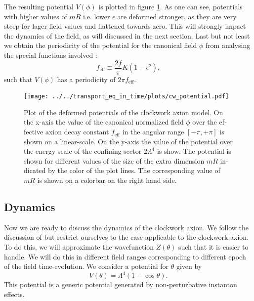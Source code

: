 \documentclass[master,       %
               twoside,        %
               BCOR10mm,       %
               english,ngerman, %
               ]{GAUBM}
\begin{document}
\begin{otherlanguage}{english}
The resulting potential $V(\phi)$ is plotted in figure \ref{fig:clockwork_pot_plot}. As one can see, potentials with higher values of $mR$ i.e. lower $\epsilon$ are deformed stronger, as they are very steep for lager field values and flattened towards zero.
This will strongly impact the dynamics of the field, as will discussed in the next section.
Last but not least we obtain the periodicity of the potential for the canonical field $\phi$ from analysing the special functions involved \cite[eq. 3.69, 3.70]{general_cont_clockwork_Choi_2018}:
\begin{equation}
    f_\mathrm{eff} \equiv \frac{2 f}{\pi} K(1 - \epsilon^2),
\end{equation}
such that $V(\phi)$ has a periodicity of $2 \pi f_\mathrm{eff}$.
\begin{figure}[H]
	\label{fig:clockwork_pot_plot}
    \texttt{[image: ../../transport\_eq\_in\_time/plots/cw\_potential.pdf]}
    \caption{Plot of the deformed potentials of the clockwork axion model. On the x-axis the value of the canonical normalized field $\phi$ over the effective axion decay constant $f_\mathrm{eff}$ in the angular range $[-\pi, +\pi]$ is shown on a linear-scale. On the y-axis the value of the potential over the energy scale of the confining sector $2 \Lambda^4$ is show. The potential is shown for different values of the size of the extra dimension $mR$ indicated by the color of the plot lines. The corresponding value of $mR$ is shown on a colorbar on the right hand side.}
\end{figure}

\subsection{Dynamics}
Now we are ready to discuss the dynamics of the clockwork axion.
We follow the discussion of \cite{Deformed_potential_Bae_2019} but restrict ourselves to the case applicable to the clockwork axion.
To do this, we will approximate the wavefunction $Z(\theta)$ such that it is easier to handle. We will do this in different field ranges corresponding to different epoch of the field time-evolution.
We consider a potential for $\theta$ given by
\begin{equation}
	V(\theta) = \Lambda^4(1 - \cos \theta).
\end{equation}
This potential is a generic potential generated by non-perturbative instanton effects.


\end{otherlanguage}
\end{document}
